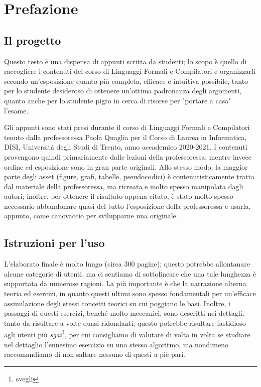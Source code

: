 \documentclass[class=book, crop=false, oneside, 12pt]{standalone}
\begin{document}
\chapter*{Prefazione}

\section*{Il progetto}
Questo testo è una dispensa di appunti scritta da studenti; lo scopo è quello di raccogliere i contenuti del corso di Linguaggi Formali e Compilatori e organizzarli secondo un'esposizione quanto più completa, efficace e intuitiva possibile, tanto per lo studente desideroso di ottenere un'ottima padronanza degli argomenti, quanto anche per lo studente pigro in cerca di risorse per "portare a casa" l'esame.

Gli appunti sono stati presi durante il corso di Linguaggi Formali e Compilatori tenuto dalla professoressa Paola Quaglia per il Corso di Laurea in Informatica, DISI, Università degli Studi di Trento, anno accademico 2020-2021. I contenuti provengono quindi primariamente dalle lezioni della professoressa, mentre invece ordine ed esposizione sono in gran parte originali. Allo stesso modo, la maggior parte degli asset (figure, grafi, tabelle, pseudocodici) è contenutisticamente tratta dal materiale della professoressa, ma ricreata e molto spesso manipolata dagli autori; inoltre, per ottenere il risultato appena citato, è stato molto spesso necessario abbandonare quasi del tutto l'esposizione della professoressa e usarla, appunto, come canovaccio per svilupparne una originale.

\section*{Istruzioni per l'uso}
L'elaborato finale è molto lungo (circa 300 pagine); questo potrebbe allontanare alcune categorie di utenti, ma ci sentiamo di sottolineare che una tale lunghezza è supportata da numerose ragioni. La più importante è che la narrazione alterna teoria ed esercizi, in quanto questi ultimi sono spesso fondamentali per un'efficace assimilazione degli stessi concetti teorici su cui poggiano le basi. Inoltre, i passaggi di questi esercizi, benché molto meccanici, sono descritti nei dettagli, tanto da risultare a volte quasi ridondanti; questo potrebbe risultare fastidioso agli utenti più \emph{sgai}\footnote{svegli}, per cui consigliamo di valutare di volta in volta se studiare nel dettaglio l'ennesimo esercizio su uno stesso algoritmo, ma nondimeno raccomandiamo di non saltare nessuno di questi a piè pari. 
\end{document}

